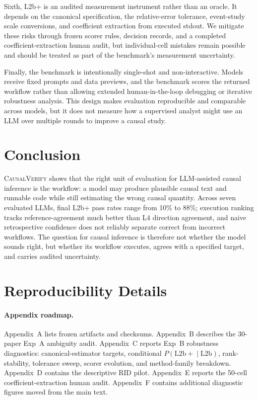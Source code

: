 \documentclass{article}
\begin{document}
Sixth, L2b+ is an audited measurement instrument rather than an oracle.
It depends on the canonical specification, the relative-error tolerance,
event-study scale conversions, and coefficient extraction from executed
stdout. We mitigate these risks through frozen scorer rules, decision
records, and a completed coefficient-extraction human audit, but
individual-cell mistakes remain possible and should be treated as part
of the benchmark's measurement uncertainty.

Finally, the benchmark is intentionally single-shot and non-interactive.
Models receive fixed prompts and data previews, and the benchmark scores
the returned workflow rather than allowing extended human-in-the-loop
debugging or iterative robustness analysis. This design makes evaluation
reproducible and comparable across models, but it does not measure how a
supervised analyst might use an LLM over multiple rounds to improve a
causal study.

\section{Conclusion}

\textsc{CausalVerify} shows that the right unit of evaluation for
LLM-assisted causal inference is the workflow: a model may produce
plausible causal text and runnable code while still estimating the
wrong causal quantity. Across seven evaluated LLMs, final L2b+ pass
rates range from 10\% to 88\%; execution ranking tracks
reference-agreement much better than L4 direction agreement, and
naive retrospective confidence does not reliably separate correct
from incorrect workflows. The question for causal inference is
therefore not whether the model sounds right, but whether its
workflow executes, agrees with a specified target, and carries
audited uncertainty.

\clearpage
{}
\label{sec:references-start}



\clearpage
\appendix

\section{Reproducibility Details}
\label{app:reproducibility}

\paragraph{Appendix roadmap.}
Appendix~A lists frozen artifacts and checksums. Appendix~B describes the
30-paper Exp~A ambiguity audit. Appendix~C reports Exp~B robustness
diagnostics: canonical-estimator targets, conditional
$P(\mathrm{L2b+}\mid\mathrm{L2b})$, rank-stability, tolerance sweep, scorer
evolution, and method-family breakdown. Appendix~D
contains the descriptive RID pilot. Appendix~E reports the 50-cell
coefficient-extraction human audit. Appendix~F contains additional
diagnostic figures moved from the main text.
\end{document}
